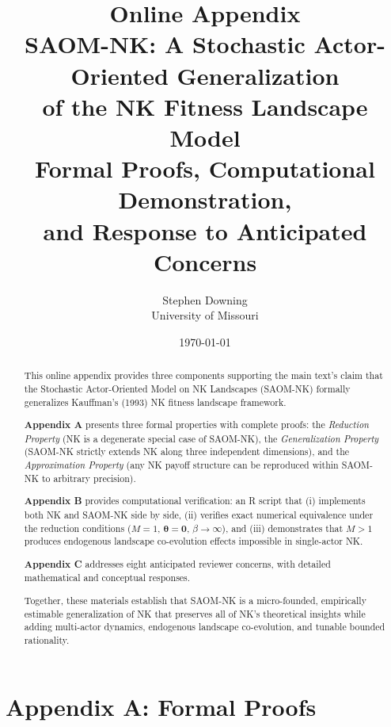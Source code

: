 \documentclass[12pt]{article}
\title{%
  \textbf{Online Appendix}\\[6pt]
  \large SAOM-NK: A Stochastic Actor-Oriented Generalization\\
  of the NK Fitness Landscape Model\\[12pt]
  \normalsize Formal Proofs, Computational Demonstration,\\
  and Response to Anticipated Concerns}
\author{Stephen Downing\\
  \small University of Missouri}
\date{\today}
\begin{document}
\maketitle
\thispagestyle{empty}

\vspace{1cm}

\begin{abstract}
\noindent
This online appendix provides three components supporting the main text's
claim that the Stochastic Actor-Oriented Model on NK Landscapes (SAOM-NK)
formally generalizes Kauffman's (1993) NK fitness landscape framework.

\medskip\noindent
\textbf{Appendix A} presents three formal properties with complete proofs:
the \emph{Reduction Property} (NK is a degenerate special case of SAOM-NK),
the \emph{Generalization Property} (SAOM-NK strictly extends NK along three
independent dimensions), and the \emph{Approximation Property} (any NK
payoff structure can be reproduced within SAOM-NK to arbitrary precision).

\medskip\noindent
\textbf{Appendix B} provides computational verification: an R script that
(i) implements both NK and SAOM-NK side by side, (ii) verifies exact
numerical equivalence under the reduction conditions ($M=1$,
$\boldsymbol{\theta}=\mathbf{0}$, $\beta\to\infty$), and (iii) demonstrates
that $M>1$ produces endogenous landscape co-evolution effects impossible
in single-actor NK.

\medskip\noindent
\textbf{Appendix C} addresses eight anticipated reviewer concerns, with
detailed mathematical and conceptual responses.

\medskip\noindent
Together, these materials establish that SAOM-NK is a micro-founded,
empirically estimable generalization of NK that preserves all of NK's
theoretical insights while adding multi-actor dynamics, endogenous
landscape co-evolution, and tunable bounded rationality.
\end{abstract}

\newpage
\tableofcontents
\newpage


\part*{Appendix A: Formal Proofs}
\end{document}

